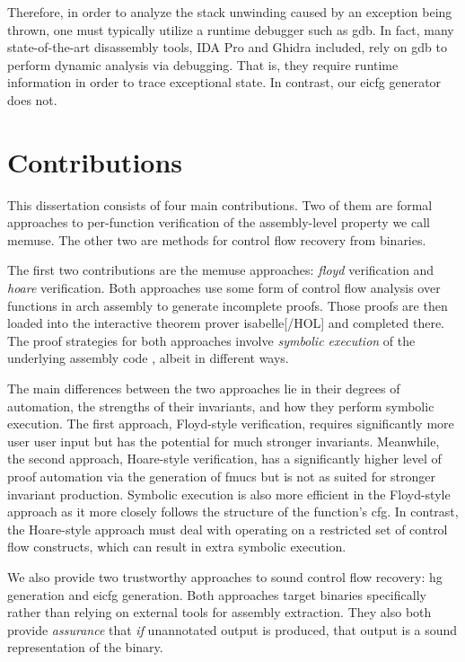 Therefore, in order to analyze the stack unwinding caused by an exception being thrown, one must typically utilize a runtime debugger such as \ac{gdb}.
In fact, many state-of-the-art disassembly tools, IDA Pro and Ghidra included,
rely on \ac{gdb} to perform dynamic analysis via debugging.
That is, they require runtime information in order to trace exceptional state.
In contrast, our \ac{eicfg} generator does not.

\section{Contributions}
This dissertation consists of four main contributions.
Two of them are formal approaches to per-function verification of the assembly-level property we call \gls{memuse}.
The other two are methods for control flow recovery from binaries.

The first two contributions are the \gls{memuse} approaches: \emph{\gls{floyd}} verification and \emph{\gls{hoare}} verification.
Both approaches use some form of control flow analysis over functions in \gls{arch} assembly to generate incomplete proofs.
Those proofs are then loaded into the interactive theorem prover \gls{isabelle}[/HOL] \autocite{nipkow2002isabelle} and completed there.
The proof strategies for both approaches involve \emph{symbolic execution} of the underlying assembly code \autocite{king1976symbolic}, albeit in different ways.

The main differences between the two approaches lie in their degrees of automation, the strengths of their invariants, and how they perform symbolic execution.
The first approach, Floyd-style verification, requires significantly more user user input but has the potential for much stronger invariants.
Meanwhile, the second approach, Hoare-style verification, has a significantly higher level of proof automation via the generation of \acp{fmuc} but is not as suited for stronger invariant production.
Symbolic execution is also more efficient in the Floyd-style approach as it more closely follows the structure of the function's \ac{cfg}.
In contrast, the Hoare-style approach must deal with operating on a restricted set of control flow constructs, which can result in extra symbolic execution.

We also provide two trustworthy approaches to sound control flow recovery: \ac{hg} generation and \ac{eicfg} generation.
Both approaches target binaries specifically rather than relying on external tools for assembly extraction.
They also both provide \emph{assurance} that \emph{if} unannotated output is produced, that output is a sound representation of the binary.


